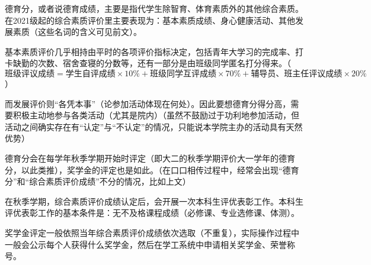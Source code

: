 
德育分，或者说德育成绩，主要是指代学生除智育、体育素质外的其他综合素质。在2021级起的综合素质评价里主要表现为：基本素质成绩、身心健康活动、其他发展素质（这些名词的含义可见前文）。

基本素质评价几乎相持由平时的各项评价指标决定，包括青年大学习的完成率、打卡缺勤的次数、宿舍查寝的分数等，还有一部分是由班级同学匿名打分得来。（$\text{班级评议成绩}=\text{学生自评成绩}\times10\%+\text{班级同学互评成绩}\times70\%+\text{辅导员、班主任评议成绩}\times20\%$）

而发展评价则“各凭本事”（论参加活动体现在何处）。因此要想德育分得分高，需要积极主动地参与各类活动（尤其是院内）（虽然不鼓励过于功利地参加活动，但活动之间确实存在有“认定”与“不认定”的情况，只能说本学院主办的活动具有天然优势）

德育分会在每学年秋季学期开始时评定（即大二的秋季学期评价大一学年的德育分，以此类推），奖学金的评定也是如此。（在口口相传过程中，经常会出现“德育分”和“综合素质评价成绩”不分的情况，比如上文）


在秋季学期，综合素质评价成绩认定后，会开展一次本科生评优表彰工作。本科生评优表彰工作的基本条件是：无不及格课程成绩（必修课、专业选修课、体测）。

奖学金评定一般依照当年综合素质评价成绩依次选取（不重复），实际操作过程中一般会公示每个人获得什么奖学金，然后在学工系统中申请相关奖学金、荣誉称号。

